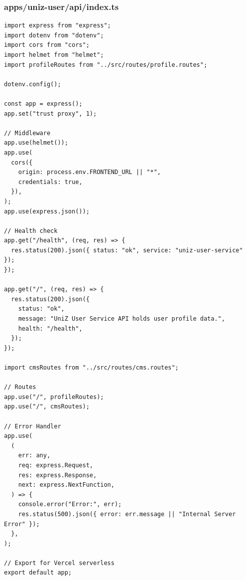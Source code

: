 \documentclass[11pt,a4paper,oneside]{article}
\begin{document}
\subsubsection*{apps/uniz-user/api/index.ts}
\begin{lstlisting}
import express from "express";
import dotenv from "dotenv";
import cors from "cors";
import helmet from "helmet";
import profileRoutes from "../src/routes/profile.routes";

dotenv.config();

const app = express();
app.set("trust proxy", 1);

// Middleware
app.use(helmet());
app.use(
  cors({
    origin: process.env.FRONTEND_URL || "*",
    credentials: true,
  }),
);
app.use(express.json());

// Health check
app.get("/health", (req, res) => {
  res.status(200).json({ status: "ok", service: "uniz-user-service" });
});

app.get("/", (req, res) => {
  res.status(200).json({
    status: "ok",
    message: "UniZ User Service API holds user profile data.",
    health: "/health",
  });
});

import cmsRoutes from "../src/routes/cms.routes";

// Routes
app.use("/", profileRoutes);
app.use("/", cmsRoutes);

// Error Handler
app.use(
  (
    err: any,
    req: express.Request,
    res: express.Response,
    next: express.NextFunction,
  ) => {
    console.error("Error:", err);
    res.status(500).json({ error: err.message || "Internal Server Error" });
  },
);

// Export for Vercel serverless
export default app;

\end{lstlisting}
\end{document}
